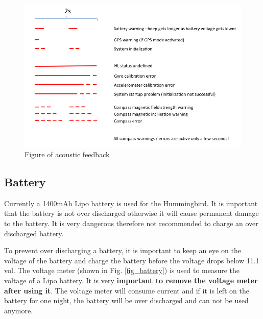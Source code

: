 \documentclass[idxtotoc,hyperref,openany]{labbook} %
\begin{document}
\begin{figure}[h!]
\centering
\includegraphics[scale=0.5]{./Figure/Acoustic}
\caption{Figure of acoustic feedback}\label{fig_acoustic}
\end{figure}

\subsection{Battery}
 
Currently a 1400mAh Lipo battery is used for the Hummingbird. It is important that the battery is not over discharged otherwise it will cause permanent damage to the battery. It is very dangerous therefore not recommended to charge an over discharged battery.

To prevent over discharging a battery, it is important to keep an eye on the voltage of the battery and charge the battery before the voltage drops below 11.1 vol. The voltage meter (shown in Fig. \ref{fig_battery}) is used to measure the voltage of a Lipo battery. It is very \textbf{important to remove the voltage meter after using it}. The voltage meter will consume current and if it is left on the battery for one night, the battery will be over discharged and can not be used anymore. 
\end{document}
